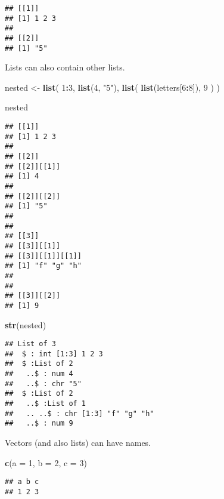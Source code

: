 \documentclass[]{book}
\newenvironment{Shaded}{\begin{snugshade}}{\end{snugshade}}
\newcommand{\DataTypeTok}[1]{\textcolor[rgb]{0.13,0.29,0.53}{#1}}
\newcommand{\DecValTok}[1]{\textcolor[rgb]{0.00,0.00,0.81}{#1}}
\newcommand{\KeywordTok}[1]{\textcolor[rgb]{0.13,0.29,0.53}{\textbf{#1}}}
\newcommand{\NormalTok}[1]{#1}
\newcommand{\OperatorTok}[1]{\textcolor[rgb]{0.81,0.36,0.00}{\textbf{#1}}}
\newcommand{\StringTok}[1]{\textcolor[rgb]{0.31,0.60,0.02}{#1}}
\begin{document}
\begin{verbatim}
## [[1]]
## [1] 1 2 3
## 
## [[2]]
## [1] "5"
\end{verbatim}

Lists can also contain other lists.

\begin{Shaded}
\begin{Highlighting}[]
\NormalTok{nested <-}\StringTok{ }\KeywordTok{list}\NormalTok{(}
  \DecValTok{1}\OperatorTok{:}\DecValTok{3}\NormalTok{,}
  \KeywordTok{list}\NormalTok{(}\DecValTok{4}\NormalTok{, }\StringTok{"5"}\NormalTok{),}
  \KeywordTok{list}\NormalTok{(}
    \KeywordTok{list}\NormalTok{(letters[}\DecValTok{6}\OperatorTok{:}\DecValTok{8}\NormalTok{]),}
    \DecValTok{9}
\NormalTok{  )}
\NormalTok{)}

\NormalTok{nested}
\end{Highlighting}
\end{Shaded}

\begin{verbatim}
## [[1]]
## [1] 1 2 3
## 
## [[2]]
## [[2]][[1]]
## [1] 4
## 
## [[2]][[2]]
## [1] "5"
## 
## 
## [[3]]
## [[3]][[1]]
## [[3]][[1]][[1]]
## [1] "f" "g" "h"
## 
## 
## [[3]][[2]]
## [1] 9
\end{verbatim}

\begin{Shaded}
\begin{Highlighting}[]
\KeywordTok{str}\NormalTok{(nested)}
\end{Highlighting}
\end{Shaded}

\begin{verbatim}
## List of 3
##  $ : int [1:3] 1 2 3
##  $ :List of 2
##   ..$ : num 4
##   ..$ : chr "5"
##  $ :List of 2
##   ..$ :List of 1
##   .. ..$ : chr [1:3] "f" "g" "h"
##   ..$ : num 9
\end{verbatim}

Vectors (and also lists) can have names.

\begin{Shaded}
\begin{Highlighting}[]
\KeywordTok{c}\NormalTok{(}\DataTypeTok{a =} \DecValTok{1}\NormalTok{, }\DataTypeTok{b =} \DecValTok{2}\NormalTok{, }\DataTypeTok{c =} \DecValTok{3}\NormalTok{)}
\end{Highlighting}
\end{Shaded}

\begin{verbatim}
## a b c 
## 1 2 3
\end{verbatim}
\end{document}
